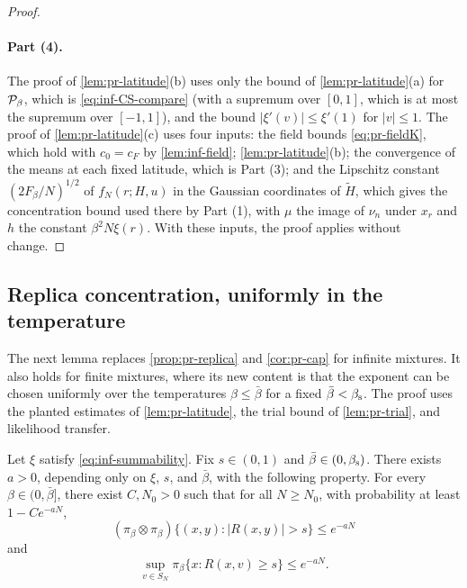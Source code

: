 \begin{proof}
\paragraph{Part (4).} The proof of \cref{lem:pr-latitude}(b) uses only the bound of \cref{lem:pr-latitude}(a) for $\mathcal P_\beta$, which is \eqref{eq:inf-CS-compare} (with a supremum over $[0,1]$, which is at most the supremum over $[-1,1]$), and the bound $|\xi'(v)|\le\xi'(1)$ for $|v|\le1$. The proof of \cref{lem:pr-latitude}(c) uses four inputs: the field bounds \eqref{eq:pr-fieldK}, which hold with $c_0=c_F$ by \cref{lem:inf-field}; \cref{lem:pr-latitude}(b); the convergence of the means at each fixed latitude, which is Part (3); and the Lipschitz constant $(2F_\beta/N)^{1/2}$ of $f_N(r;H,u)$ in the Gaussian coordinates of $\widetilde H$, which gives the concentration bound used there by Part (1), with $\mu$ the image of $\nu_n$ under $x_r$ and $h$ the constant $\beta^2N\xi(r)$. With these inputs, the proof applies without change.
\end{proof}

\subsection{Replica concentration, uniformly in the temperature}\label{sec:inf-replica}

The next lemma replaces \cref{prop:pr-replica} and \cref{cor:pr-cap} for infinite mixtures. It also holds for finite mixtures, where its new content is that the exponent can be chosen uniformly over the temperatures $\beta\le\bar\beta$ for a fixed $\bar\beta<\beta_{\mathrm s}$. The proof uses the planted estimates of \cref{lem:pr-latitude}, the trial bound of \cref{lem:pr-trial}, and likelihood transfer.

\begin{lemma}\label{lem:inf-replica}
Let $\xi$ satisfy \eqref{eq:inf-summability}. Fix $s\in(0,1)$ and $\bar\beta\in(0,\beta_{\mathrm s})$. There exists $a>0$, depending only on $\xi$, $s$, and $\bar\beta$, with the following property. For every $\beta\in(0,\bar\beta]$, there exist $C,N_0>0$ such that for all $N\ge N_0$, with probability at least $1-Ce^{-aN}$,
\begin{equation}\label{eq:inf-replica}
(\pi_\beta\otimes\pi_\beta)\bigl\{(x,y):|R(x,y)|>s\bigr\}\le e^{-aN}
\end{equation}
and
\begin{equation}\label{eq:inf-cap}
\sup_{v\in S_N}\pi_\beta\{x:R(x,v)\ge s\}\le e^{-aN}.
\end{equation}
\end{lemma}

